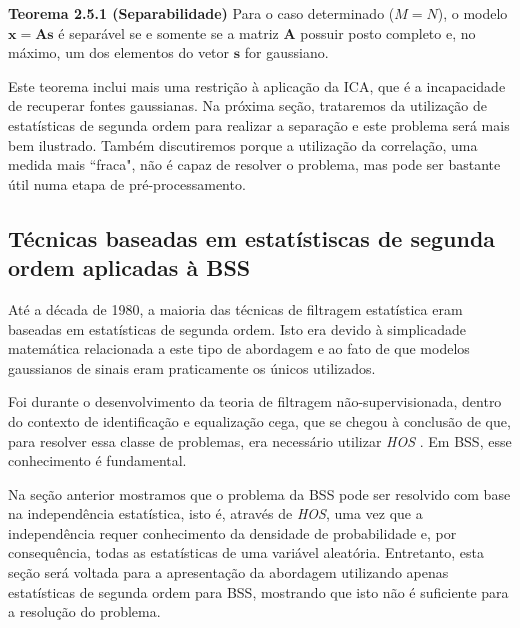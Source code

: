     \bigskip
    
    \textbf{Teorema 2.5.1 (Separabilidade)} Para o caso determinado ($M=N$), o modelo $\mathbf{x=As}$ é separável se e somente se a matriz $\mathbf{A}$ possuir posto completo e, no máximo, um dos elementos do vetor $\mathbf{s}$ for gaussiano.
    
    \bigskip
    
    Este teorema inclui mais uma restrição à aplicação da ICA, que é a incapacidade de recuperar fontes gaussianas. Na próxima seção, trataremos da utilização de estatísticas de segunda ordem para realizar a separação e este problema será mais bem ilustrado. Também discutiremos porque a utilização da correlação, uma medida mais ``fraca", não é capaz de resolver o problema, mas pode ser bastante útil numa etapa de pré-processamento.
  
\subsection{Técnicas baseadas em estatístiscas de segunda ordem aplicadas à BSS}\label{secondorder}

    Até a década de 1980, a maioria das técnicas de filtragem estatística eram baseadas em estatísticas de segunda ordem. Isto era devido à simplicadade matemática relacionada a este tipo de abordagem e ao fato de que modelos gaussianos de sinais eram praticamente os únicos utilizados. 
    
    Foi durante o desenvolvimento da teoria de filtragem não-supervisionada, dentro do contexto de identificação e equalização cega, que se chegou à conclusão de que, para resolver essa classe de problemas, era necessário utilizar \textit{HOS} \cite{HOS}. Em BSS, esse conhecimento é fundamental.
    
    Na seção anterior mostramos que o problema da BSS pode ser resolvido com base na independência estatística, isto é, através de \textit{HOS}, uma vez que a independência requer conhecimento da densidade de probabilidade e, por consequência, todas as estatísticas de uma variável aleatória. Entretanto, esta seção será voltada para a apresentação da abordagem utilizando apenas estatísticas de segunda ordem para BSS, mostrando que isto não é suficiente para a resolução do problema.
    
